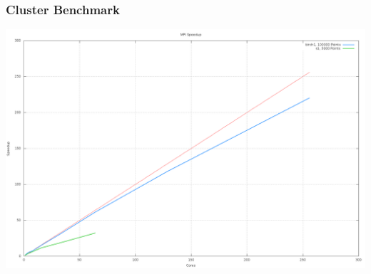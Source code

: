 \documentclass[10pt]{beamer}
\begin{document}
\begin{frame}
	\frametitle{Cluster Benchmark}
	\includegraphics[scale=0.25, keepaspectratio]{../output/pics/speedup.png}
\end{frame}
\end{document}
